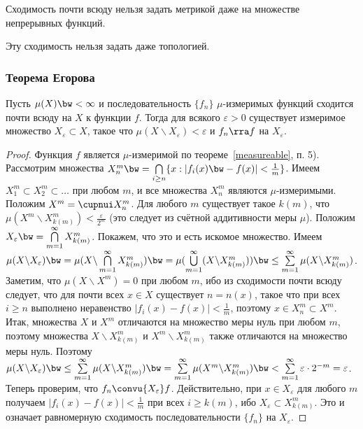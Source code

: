 \documentclass[10pt]{article}
\newcommand{\ve}{\varepsilon}
\begin{document}
\begin{problem}
Сходимость почти всюду нельзя задать метрикой даже на множестве
непрерывных функций.
\end{problem}

\begin{note}
Эту сходимость нельзя задать даже топологией.
\end{note}

\subsubsection{Теорема Егорова}

\begin{theorem}[Егоров]
Пусть $\mu(X)\bw <\infty$ и последовательность $\{f_n\}$
$\mu$-измеримых функций сходится почти всюду на $X$ к функции $f$.
Тогда для всякого $\ve>0$ существует измеримое множество
$X_\ve\subset X$, такое что $\mu(X\backslash X_\ve)<\ve$ и $f_n\rra
f$ на $X_\ve$.
\end{theorem}

\begin{proof}
Функция $f$ является $\mu$-измеримой по теореме~\ref{measureable},
п. 5). Рассмотрим множества $X_n^m\bw =\bigcap\limits_{i\ge
n}\{x:|f_i(x)\bw -f(x)|<\frac1m\}$. Имеем $X_1^m\subset X_2^m\subset
\ldots$ при любом $m$, и все множества $X_n^m$ являются
$\mu$-измеримыми. Положим $X^m=\cupnui X_n^m$. Для любого $m$
существует такое $k(m)$, что $\mu(X^m\backslash
X_{k(m)}^m)<\frac{\ve}{2^m}$ (это следует из счётной аддитивности
меры $\mu$). Положим $X_\ve\bw =\bigcap\limits_{m=1}^\infty
X_{k(m)}^m$. Покажем, что это и есть искомое множество. Имеем
$\mu(X\backslash X_\ve)\bw =\mu(X\backslash
\bigcap\limits_{m=1}^\infty X_{k(m)}^m)\bw
=\mu(\bigcup\limits_{m=1}^\infty(X\backslash X_{k(m)}^m))\bw
\le\sum\limits_{m=1}^\infty\mu(X\backslash X_{k(m)}^m)$. Заметим,
что $\mu(X\backslash X^m)=0$ при любом $m$, ибо из сходимости почти
всюду следует, что для почти всех $x\in X$ существует $n=n(x)$,
такое что при всех $i\ge n$ выполнено неравенство
$|f_i(x)-f(x)|<\frac1m$, поэтому $x\in X_n^m\subset X^m$. Итак,
множества $X$ и $X^m$ отличаются на множество меры нуль при любом
$m$, поэтому множества $X\backslash X_{k(m)}^m$ и $X^m\backslash
X_{k(m)}^m$ также отличаются на множество меры нуль. Поэтому
$\mu(X\backslash X_\ve)\bw
\le\sum\limits_{m=1}^\infty\mu(X\backslash X_{k(m)}^m)\bw =
\sum\limits_{m=1}^\infty\mu(X^m\backslash X_{k(m)}^m)\bw
<\sum\limits_{m=1}^\infty\ve\cdot 2^{-m}=\ve$. Теперь проверим, что
$f_n\convu{X_\ve}f$. Действительно, при $x\in X_\ve$ для любого $m$
получаем $|f_i(x)-f(x)|<\frac1m$ при всех $i\ge k(m)$, ибо
$X_\ve\subset X_{k(m)}^m$. Это и означает равномерную сходимость
последовательности $\{f_n\}$ на $X_\ve$.
\end{proof}
\end{document}
